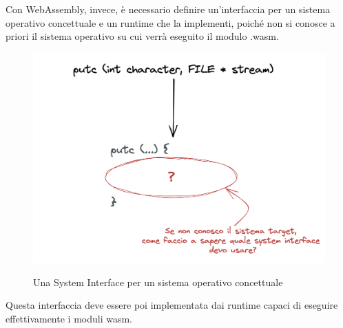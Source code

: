 Con WebAssembly, invece, è necessario definire un'interfaccia per un sistema operativo concettuale e un runtime che la implementi, poiché non si conosce a priori il sistema operativo su cui verrà eseguito il modulo .wasm.
\begin{figure}[H]
    \centering
    \captionsetup{justification=centering}
    \includegraphics[width=15cm]{./images/5a.wasi_sys_interface.png}
    \label{system-interface-conceptual-sys}
    \caption{Una System Interface per un sistema operativo concettuale}
\end{figure}
Questa interfaccia deve essere poi implementata dai runtime capaci di eseguire effettivamente i moduli wasm.


